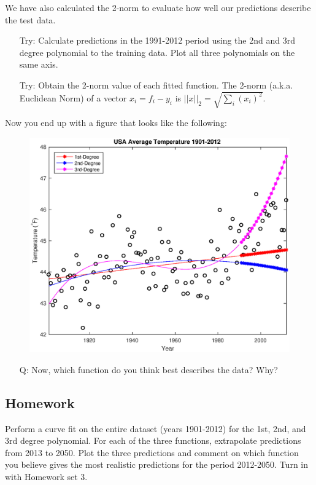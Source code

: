 \documentclass[12pt]{article}
\begin{document}
We have also calculated the 2-norm to evaluate how well our predictions describe the test data. 

\begin{enumerate}
\item[Try:] Calculate predictions in the 1991-2012 period using the 2nd and 3rd degree polynomial to the training data. Plot all three polynomials on the same axis. 
\item[Try:] Obtain the 2-norm value of each fitted function. The 2-norm (a.k.a. Euclidean Norm) of a vector $x_i = f_i-y_i$  is $||x||_2=\sqrt{\sum_i(x_i)^2}$. 
\end{enumerate}

Now you end up with a figure that looks like the following:

\begin{figure}[H]
\centering
\includegraphics[width=0.75\linewidth]{tempVsYearTest.eps}
\end{figure}

\begin{enumerate}
\item[Q:] Now, which function do you think best describes the data? Why?
\end{enumerate}

\subsection{Homework}
Perform a curve fit on the entire dataset (years 1901-2012) for the 1st, 2nd, and 3rd degree polynomial. For each of the three functions, extrapolate predictions from 2013 to 2050. Plot the three predictions and comment on which function you believe gives the most realistic predictions for the period 2012-2050. Turn in with Homework set 3. 
\end{document}
